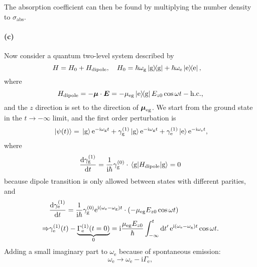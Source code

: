 \documentclass[hyperref, a4paper]{article}
\newcommand*{\ii}{\mathrm{i}}
\newcommand*{\ee}{\mathrm{e}}
\newcommand*{\Gammae}{\Gamma_{\text{e}}}
\newcommand*{\omegae}{\omega_{\text{e}}}
\newcommand*{\omegag}{\omega_{\text{g}}}
\begin{document}
The absorption coefficient can then be found 
by multiplying the number density to $\sigma_{\text{abs}}$.

\paragraph{(c)} Now consider a quantum two-level system described by 
\begin{equation}
    H = H_0 + H_{\text{dipole}}, \quad 
    H_0 = \hbar \omegag \dyad{\text{g}}
    + \hbar \omegae \dyad{\text{e}} , \quad 
\end{equation}
where
\begin{equation}
    H_{\text{dipole}} = - \vb*{\mu} \cdot \vb*{E} 
    = - \mu_{\text{eg}} \dyad{\text{e}}{\text{g}} E_{z0} \cos \omega t - \text{h.c.},
\end{equation}
and the $z$ direction is set to the direction of $\vb*{\mu}_{\text{eg}}$.
We start from the ground state in the $t \to - \infty$ limit, 
and the first order perturbation is 
\begin{equation}
    \ket*{\psi(t)} = \ket*{\text{g}} \ee^{- \ii \omegag t} 
    + \gamma^{(1)}_{\text{g}} \ket*{\text{g}} \ee^{- \ii \omegag t} 
    + \gamma^{(1)}_{\text{e}} \ket*{\text{e}} \ee^{- \ii \omegae t} ,
    \label{eq:first-pt-wave-function}
\end{equation}
where 
\begin{equation}
    \dv{\gamma^{(1)}_{\text{g}}}{t} = \frac{1}{\ii \hbar} \gamma^{(0)}_{\text{g}} \cdot \expval*{H_{\text{dipole}}}{\text{g}} = 0
\end{equation}
because dipole transition is only allowed between states with different parities, and 
\begin{equation}
    \begin{aligned}
        &\dv{\gamma_\text{e}^{(1)}}{t} = \frac{1}{\ii \hbar} 
        \gamma_{\text{g}}^{(0)} \ee^{\ii (\omegae - \omegag) t} 
        \cdot (- \mu_{\text{eg}} E_{z0} \cos \omega t ) \\
        \Rightarrow & 
        \gamma^{(1)}_{\text{e}}(t) - \underbrace{
            \Gammae^{(1)}(t=0)
        }_{0} = \ii \frac{\mu_{\text{eg}} E_{z0}}{\hbar} 
        \int_{- \infty}^{t} \dd{t'} \ee^{\ii (\omegae - \omegag) t}  \cos \omega t  .
    \end{aligned}
\end{equation}
Adding a small imaginary part to $\omegae$ because of spontaneous emission:
\begin{equation}
    \omegae \to \omegae - \ii \Gammae,
\end{equation}
\end{document}
